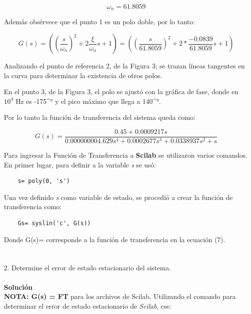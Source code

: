 \documentclass[12pt,letterpaper]{article}
\begin{document}
\begin{equation*}
    \omega_n = 61.8059
\end{equation*}


Además obsérvece que el punto 1 es un polo doble, por lo tanto:

\begin{equation}
    G(s)= ((\frac{s}{\omega_n})^2 + 2\frac{\xi}{\omega_n}s +1) = ((\frac{s}{61.8059})^2 +2*\frac{-0.0839}{61.8059}s + 1)
\end{equation}

Analizando el punto de referencia 2, de la Figura 3; se trazan líneas tangentes en la curva para determinar la existencia de otros polos.

En el punto 3, de la Figura 3, el polo se ajustó con la gráfica de fase, donde en $10^4$ Hz es -175$\^°$ y el pico máximo que llega a 140$\^°$.

Por lo tanto la función de transferencia del sistema queda como:

\begin{equation}
    G(s) = \frac{0.45+ 0.0009217s}{0.000000004.629s^4+0.0002677s^3+0.0338937s^2 +s}
\end{equation}

Para ingresar la Función de Transferencia a \textbf{Scilab} se utilizaron varios comandos. En primer lugar, para definir a la variable \textit{s} se usó:

\begin{verbatim}
    s= poly(0, 's')
\end{verbatim}

Una vez definido \textit{s} como variable de estado, se procedió a crear la función de transferencia como:

\begin{verbatim}
    Gs= syslin('c', G(s))
\end{verbatim}

Donde G(s)= corresponde a la función de transferencia en la ecuación (7).\\

\\
\\
2. Determine el error de estado estacionario del sistema.\\
\\
\textbf{Solución}\\


\textbf{NOTA: G(s) = FT} para los archivos de Scilab.
Utilizando el comando para determinar el error de estado estacionario de \textit{Scilab}, css:
\end{document}
